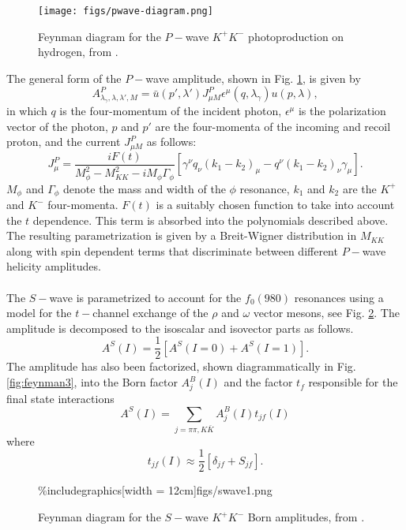 \documentclass[twocolumn,superscriptaddress,prd]{revtex4}
\begin{document}
\begin{figure}
\texttt{[image: figs/pwave-diagram.png]}
\caption{Feynman diagram for the $P-$wave $K^+K^-$ photoproduction on hydrogen, from \cite{Lesniak:2005}.}
\label{fig:feynman1}
\end{figure}

\noindent
The general form of the $P-$wave amplitude, shown in Fig. \ref{fig:feynman1}, is given by
\begin{equation}
A^{P}_{\lambda_{\gamma},\lambda,\lambda',M} = \bar{u}(p',\lambda')J^{P}_{\mu M} \epsilon^{\mu}(q,\lambda_{\gamma})u(p,\lambda),
\end{equation}
in which $q$ is the four-momentum of the incident photon, $\epsilon^{\mu}$ is the polarization vector of the photon, $p$ and $p'$ are the four-momenta of the incoming and recoil proton, and the current $J^{P}_{\mu M}$ as follows:
\begin{equation}
J^P_{\mu} = \frac{iF(t)}{M_{\phi}^2 - M_{KK}^2 - i M_{\phi} \Gamma_{\phi} }[\gamma^{\nu} q_{\nu}(k_1-k_2)_{\mu} - q^{\nu}(k_1-k_2)_{\nu} \gamma_{\mu}].
\end{equation} 
$M_{\phi}$ and $\Gamma_{\phi}$ denote the mass and width of the $\phi$ resonance, $k_1$ and $k_2$ are the $K^+$ and $K^-$ four-momenta. $F(t)$ is a suitably chosen function to take into account the $t$ dependence. This term is absorbed into the polynomials described above. The resulting parametrization is given by a Breit-Wigner distribution in $M_{KK}$ along with spin dependent terms that discriminate between different $P-$wave helicity amplitudes. \\ \\
\noindent
The $S-$wave is parametrized to account for the  $f_0(980)$ resonances using a model for the $t-$channel exchange of the $\rho$ and $\omega$ vector mesons, see Fig. \ref{fig:feynman2}. The amplitude is decomposed to the isoscalar and isovector parts as follows.
\begin{equation}
A^S(I) = \frac{1}{2}[A^S(I=0) + A^S(I=1)].
\end{equation}
The amplitude has also been factorized, shown diagrammatically in Fig. \ref{fig:feynman3}, into the Born factor $A^B_j(I)$ and the factor $t_{f}$ responsible for the final state interactions
\begin{equation}
A^S(I) = \sum_{j=\pi \pi , K\bar{K}} A^B_j (I) t_{jf}(I)
\end{equation}
where 
\begin{equation}
t_{jf}(I) \approx \frac{1}{2}[\delta_{jf} + S_{jf}].
\end{equation}
 \begin{figure}
\%includegraphics[width = 12cm]{figs/swave1.png}
\caption{Feynman diagram for the $S-$wave $K^+K^-$ Born amplitudes, from \cite{Lesniak:2005}.}
\label{fig:feynman2}
\end{figure}
\end{document}
